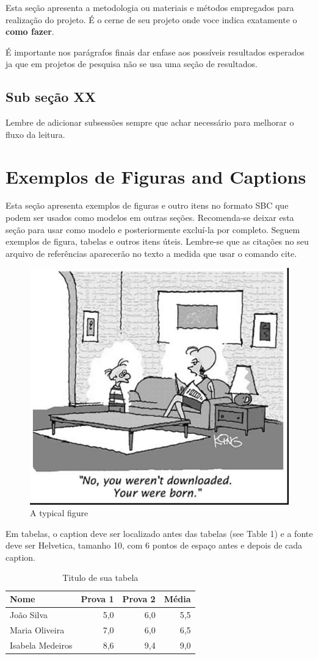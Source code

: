 \documentclass[12pt]{article}
\begin{document}
Esta seção apresenta a metodologia ou materiais e métodos empregados para realização do projeto. É o cerne de seu projeto onde voce indica exatamente o \textbf{como fazer}. 

É importante nos parágrafos finais dar enfase aos possíveis resultados esperados ja que em projetos de pesquisa não se usa uma seção de  resultados.

\subsection{Sub seção XX}

Lembre de adicionar subsessões sempre que achar necessário para melhorar o fluxo da leitura.

\section{Exemplos de Figuras and Captions}


Esta seção apresenta exemplos de  figuras e outro itens no formato SBC que podem ser usados como modelos em outras seções. Recomenda-se deixar esta seção para usar como modelo e posteriormente excluí-la por completo. Seguem exemplos de figura, tabelas e outros itens úteis. Lembre-se que as citações no seu arquivo de referências aparecerão no texto a medida que usar o comando cite.

\begin{figure}[ht]
\centering
\includegraphics[width=.5\textwidth]{fig1.jpg}
\caption{A typical figure}
\label{fig-identificador-figura}
\end{figure}

Em tabelas, o caption deve ser localizado antes  das tabelas (see Table 1)
e a fonte deve ser Helvetica, tamanho 10, com 6 pontos de espaço antes e depois de cada caption.

\begin{table}[ht]\footnotesize
\centering
\caption{Titulo de sua tabela}
\begin{tabular}{l r r r}
\hline
Nome & Prova 1 & Prova 2 & Média\\
\hline
João Silva & 5{,}0 & 6{,}0 & 5{,}5\\
Maria Oliveira & 7{,}0 & 6{,}0 & 6{,}5\\
Isabela Medeiros & 8{,}6 & 9{,}4 & 9{,}0\\
\hline
\end{tabular}
\label{tab:csvdescription}
\end{table}
\end{document}
